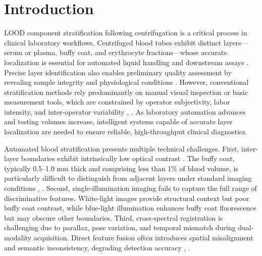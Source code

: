 \section{Introduction}
\label{sec:introduction}
LOOD component stratification following centrifugation is a critical process in clinical laboratory workflows. Centrifuged blood tubes exhibit distinct layers—serum or plasma, buffy coat, and erythrocyte fractions—whose accurate localization is essential for automated liquid handling and downstream assays \cite{blood_components}. Precise layer identification also enables preliminary quality assessment by revealing sample integrity and physiological conditions \cite{automation}. However, conventional stratification methods rely predominantly on manual visual inspection or basic measurement tools, which are constrained by operator subjectivity, labor intensity, and inter-operator variability \cite{manual_prob1}, \cite{manual_prob2}. As laboratory automation advances and testing volumes increase, intelligent systems capable of accurate layer localization are needed to ensure reliable, high-throughput clinical diagnostics.

Automated blood stratification presents multiple technical challenges. First, inter-layer boundaries exhibit intrinsically low optical contrast \cite{diff_1}. The buffy coat, typically 0.5–1.0 mm thick and comprising less than 1\% of blood volume, is particularly difficult to distinguish from adjacent layers under standard imaging conditions \cite{diff_2}, \cite{diff_3}. Second, single-illumination imaging fails to capture the full range of discriminative features. White-light images provide structural context but poor buffy coat contrast, while blue-light illumination enhances buffy coat fluorescence but may obscure other boundaries. Third, cross-spectral registration is challenging due to parallax, pose variation, and temporal mismatch during dual-modality acquisition. Direct feature fusion often introduces spatial misalignment and semantic inconsistency, degrading detection accuracy \cite{diff_cross_1}, \cite{diff_cross_2}.

